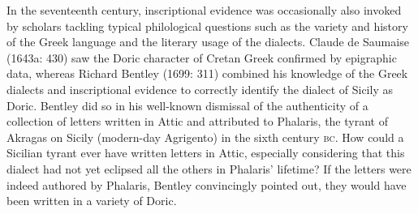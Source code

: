 \documentclass[12pt]{article}
\newenvironment{styleStandard}{\renewcommand\baselinestretch{1.25}\setlength\leftskip{0in}\setlength\rightskip{0in}\setlength\parindent{0.1972in}\setlength\parfillskip{0pt plus 1fil}\setlength\parskip{0in plus 1pt}\writerlistparindent\writerlistleftskip\leavevmode\normalfont\normalsize\writerlistlabel\ignorespaces}{\unskip\vspace{0in plus 1pt}\par}
\newcommand\writerlistleftskip{}
\newcommand\writerlistparindent{}
\newcommand\writerlistlabel{}
\begin{document}
\begin{styleStandard}
In the seventeenth century, inscriptional evidence was occasionally also invoked by scholars tackling typical philological questions such as the variety and history of the Greek language and the literary usage of the dialects. Claude de Saumaise (1643a: 430) saw the Doric character of Cretan Greek confirmed by epigraphic data, whereas Richard Bentley (1699: 311) combined his knowledge of the Greek dialects and inscriptional evidence to correctly identify the dialect of Sicily as Doric. Bentley did so in his well-known dismissal of the authenticity of a collection of letters written in Attic and attributed to Phalaris, the tyrant of Akragas on Sicily (modern-day Agrigento) in the sixth century \textsc{bc}. How could a Sicilian tyrant ever have written letters in Attic, especially considering that this dialect had not yet eclipsed all the others in Phalaris’ lifetime? If the letters were indeed authored by Phalaris, Bentley convincingly pointed out, they would have been written in a variety of Doric.
\end{styleStandard}
\end{document}
